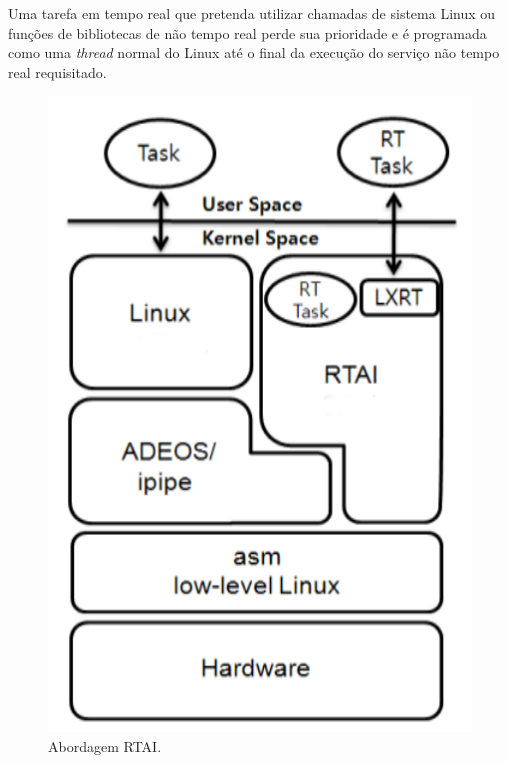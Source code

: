 \documentclass[conference]{IEEEtran}
\begin{document}
Uma tarefa em tempo real que pretenda utilizar chamadas de sistema Linux ou funções de bibliotecas de não tempo real perde sua prioridade e é programada como uma \textit{thread} normal do Linux até o final da execução do serviço não tempo real requisitado.

\begin{figure}[h]
	\centering
	\includegraphics[scale=0.22]{files/rtai.png}
	\caption{Abordagem RTAI.}
	\label{fig:rtai}
\end{figure}
\end{document}

